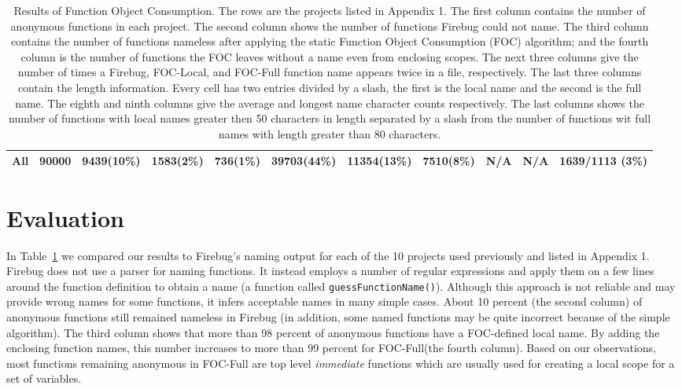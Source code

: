 \documentclass[10pt, preprint]{sigplanconf}
\begin{document}
\begin{table}[htp]
{\begin{tabular}{ | l | l | l | l | l | l | l | l | l | l | l |}
  \hline 
   All           & 90000     &   9439(10\%)   & 1583(2\%) & 736(1\%)  &    39703(44\%)      &    11354(13\%) & 7510(8\%)   & N/A       & N/A      & 1639/1113 (3\%)  \\ 
  \hline       
  \end{tabular}
  }
\caption{Results of Function Object Consumption. The rows are the projects listed in Appendix 1. The first column contains the number of anonymous functions in each project. The second column shows the number of functions Firebug could not name. The third column contains the number of functions nameless after applying the static Function Object Consumption (FOC) algorithm; and the fourth column is the number of functions the FOC leaves without a name even from enclosing scopes. The next three columns give the number of times a Firebug, FOC-Local, and FOC-Full function name appears twice in a file, respectively. The last three columns contain the length information. Every cell has two entries divided by a slash, the first is the local name and the second is the full name. The eighth and ninth columns give the average and longest name character counts respectively. The last columns shows the number of functions with local names greater then 50 characters in length separated by a slash from the number of functions wit full names with length greater than 80 characters.} 
 \label{evaluation} 
\end{table}    

\section{Evaluation}

In Table~\ref{evaluation} we compared our results to Firebug's naming output for each of the 10 projects used previously and listed in Appendix 1. Firebug does not use a parser for naming functions. It instead employs a number of regular expressions and apply them on a few lines around the function definition to obtain a name (a function called {\small \texttt{guessFunctionName()}}). Although this approach is not reliable and may provide wrong names for some functions, it infers acceptable names in many simple cases. About 10 percent (the second column) of anonymous functions still remained nameless in Firebug (in addition, some named functions may be quite incorrect because of the simple algorithm). The third column shows that more than 98 percent of anonymous functions have a FOC-defined local name. By adding the enclosing function names, this number increases to more than 99 percent for FOC-Full(the fourth column). Based on our observations, most functions remaining anonymous in FOC-Full are top level \textit{immediate} functions which are usually used for creating a local scope for a set of variables.
\end{document}
